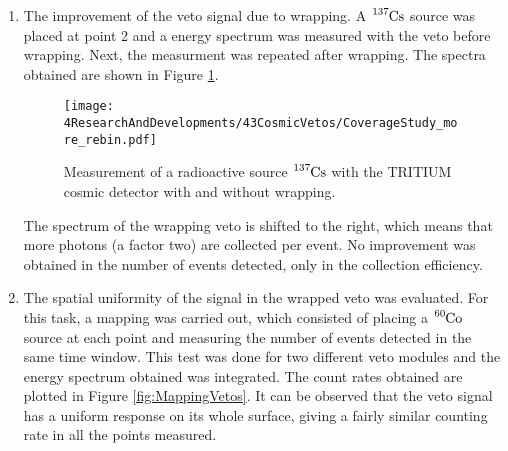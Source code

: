 \begin{enumerate}

\item{} The improvement of the veto signal due to wrapping. A $\ce{^{137}Cs}$ source was placed at point 2 and a energy spectrum was measured with the veto before wrapping. Next, the measurment was repeated after wrapping. The spectra obtained are shown in Figure \ref{fig:VetoCoverageImprovement}.

\begin{figure}[h]
\centering
\texttt{[image: 4ResearchAndDevelopments/43CosmicVetos/CoverageStudy\_more\_rebin.pdf]}
\caption{Measurement of a radioactive source $\ce{^{137}Cs}$ with the TRITIUM cosmic detector with and without wrapping.\label{fig:VetoCoverageImprovement}}
\end{figure}

The spectrum of the wrapping veto is shifted to the right, which means that more photons (a factor two) are collected per event. No improvement was obtained in the number of events detected, only in the collection efficiency.


\item{} The spatial uniformity of the signal in the wrapped veto was evaluated. For this task, a mapping was carried out, which consisted of placing a $\ce{^{60}Co}$ source at each point and measuring the number of events detected in the same time window. This test was done for two different veto modules and the energy spectrum obtained was integrated. The count rates obtained are plotted in Figure \ref{fig:MappingVetos}. It can be observed that the veto signal has a uniform response on its whole surface, giving a fairly similar counting rate in all the points measured.



\end{enumerate}
